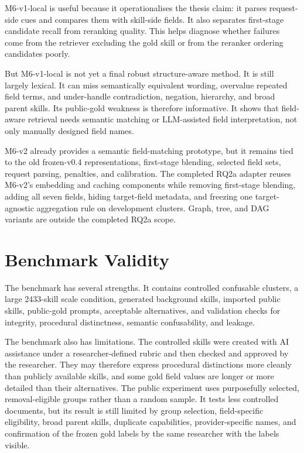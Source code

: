 M6-v1-local is useful because it operationalises the thesis claim: it parses request-side cues and compares them with skill-side fields. It also separates first-stage candidate recall from reranking quality. This helps diagnose whether failures come from the retriever excluding the gold skill or from the reranker ordering candidates poorly.

But M6-v1-local is not yet a final robust structure-aware method. It is still largely lexical. It can miss semantically equivalent wording, overvalue repeated field terms, and under-handle contradiction, negation, hierarchy, and broad parent skills. Its public-gold weakness is therefore informative. It shows that field-aware retrieval needs semantic matching or LLM-assisted field interpretation, not only manually designed field names.

M6-v2 already provides a semantic field-matching prototype, but it remains tied to the old frozen-v0.4 representations, first-stage blending, selected field sets, request parsing, penalties, and calibration. The completed RQ2a adapter reuses M6-v2's embedding and caching components while removing first-stage blending, adding all seven fields, hiding target-field metadata, and freezing one target-agnostic aggregation rule on development clusters. Graph, tree, and DAG variants are outside the completed RQ2a scope.

\section{Benchmark Validity}

The benchmark has several strengths. It contains controlled confusable clusters, a large 2433-skill scale condition, generated background skills, imported public skills, public-gold prompts, acceptable alternatives, and validation checks for integrity, procedural distinctness, semantic confusability, and leakage.

The benchmark also has limitations. The controlled skills were created with AI assistance under a researcher-defined rubric and then checked and approved by the researcher. They may therefore express procedural distinctions more cleanly than publicly available skills, and some gold field values are longer or more detailed than their alternatives. The public experiment uses purposefully selected, removal-eligible groups rather than a random sample. It tests less controlled documents, but its result is still limited by group selection, field-specific eligibility, broad parent skills, duplicate capabilities, provider-specific names, and confirmation of the frozen gold labels by the same researcher with the labels visible.

